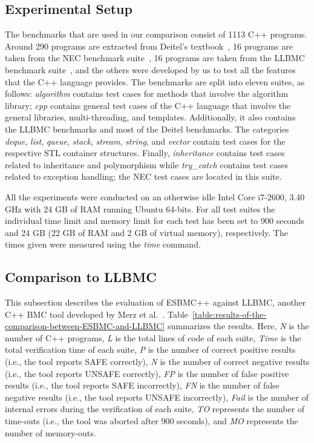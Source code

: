 \documentclass[conference]{IEEEtran}
\begin{document}
\subsection{Experimental Setup}
\label{experimental-setup}

The benchmarks that are used in our comparison consist of 1113 C++ programs.
Around 290 programs are extracted from Deitel's textbook~\cite{Deitel},
16 programs are taken from the NEC benchmark suite~\cite{NeclabsBenchmarkExceptions},
16 programs are taken from the LLBMC benchmark suite~\cite{PrabhuMBIG11},
and the others were developed by us to test all the features that the C++ language
provides. The benchmarks are split into eleven suites, as follows:
\textit{algorithm} contains test cases for methods that involve the
algorithm library; \textit{cpp} contains general test cases of the C++
language that involve the general libraries, multi-threading, and templates.
Additionally, it also contains the LLBMC benchmarks and most of the Deitel
benchmarks. The categories \textit{deque}, \textit{list}, \textit{queue},
\textit{stack}, \textit{stream}, \textit{string}, and \textit{vector} contain test cases
for the respective STL container structures.
Finally, \textit{inheritance} contains test cases related to inheritance and
polymorphism while \textit{try\_catch} contains test cases related to exception handling;
the NEC test cases are located in this suite.

All the experiments were conducted on an otherwise idle Intel Core i7-2600,
3.40 GHz with 24 GB of RAM running Ubuntu 64-bits. For all test suites
the individual time limit and memory limit for each test has been set to 900 seconds
and 24 GB (22 GB of RAM and 2 GB of virtual memory), respectively.
The times given were measured using the \textit{time} command.

\subsection{Comparison to LLBMC}
\label{comparison-to-LLBMC}

This subsection describes the evaluation of ESBMC++
against LLBMC, another C++ BMC tool developed by Merz et al.~\cite{Florian12}.
Table~\ref{table:results-of-the-comparison-between-ESBMC-and-LLBMC}
summarizes the results. Here, \textit{N} is the number of C++ programs,
\textit{L} is the total lines of code of each suite, \textit{Time} is the
total verification time of each suite, \textit{P} is the
number of correct positive results (i.e., the tool reports SAFE correctly),
\textit{N} is the number of correct negative results (i.e., the tool reports
UNSAFE correctly), \textit{FP} is the number of false positive
results (i.e., the tool reports SAFE incorrectly), \textit{FN} is the number
of false negative results (i.e., the tool reports UNSAFE incorrectly), \textit{Fail}
is the number of internal errors during the verification of each suite,
\textit{TO} represents the number of time-outs (i.e., the tool was
aborted after 900 seconds),
and \textit{MO} represents the number of memory-outs.
\end{document}

